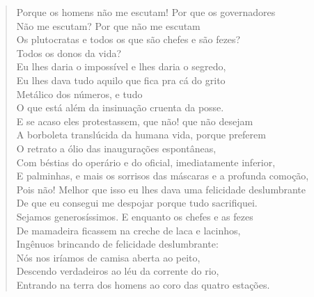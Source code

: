 {\begin{verse}
Porque os homens não me escutam! Por que os governadores\\
Não me escutam? Por que não me escutam\\
Os plutocratas e todos os que são chefes e são fezes?\\
Todos os donos da vida?\\
Eu lhes daria o impossível e lhes daria o segredo,\\
Eu lhes dava tudo aquilo que fica pra cá do grito\\
Metálico dos números, e tudo\\
O que está além da insinuação cruenta da posse.\\
E se acaso eles protestassem, que não! que não desejam\\
A borboleta translúcida da humana vida, porque preferem\\
O retrato a ólio das inaugurações espontâneas,\\
Com béstias do operário e do oficial, imediatamente inferior,\\
E palminhas, e mais os sorrisos das máscaras e a profunda comoção,\\
Pois não! Melhor que isso eu lhes dava uma felicidade deslumbrante\\
De que eu consegui me despojar porque tudo sacrifiquei.\\
Sejamos generosíssimos. E enquanto os chefes e as fezes\\
De mamadeira ficassem na creche de laca e lacinhos,\\
Ingênuos brincando de felicidade deslumbrante:\\
Nós nos iríamos de camisa aberta ao peito,\\
Descendo verdadeiros ao léu da corrente do rio,\\
Entrando na terra dos homens ao coro das quatro estações.


\end{verse}}
